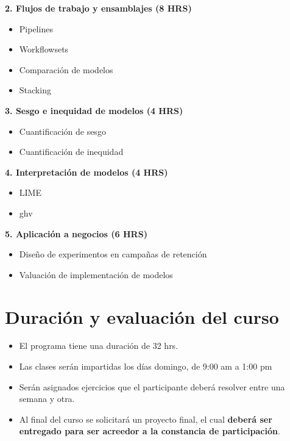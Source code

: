 \documentclass[
]{book}
\providecommand{\tightlist}{%
  \setlength{\itemsep}{0pt}\setlength{\parskip}{0pt}}
\begin{document}
\textbf{2. Flujos de trabajo y ensamblajes (8 HRS)}

\begin{itemize}
\tightlist
\item
  Pipelines
\item
  Workflowsets
\item
  Comparación de modelos
\item
  Stacking
\end{itemize}

\textbf{3. Sesgo e inequidad de modelos (4 HRS)}

\begin{itemize}
\tightlist
\item
  Cuantificación de sesgo
\item
  Cuantificación de inequidad
\end{itemize}

\textbf{4. Interpretación de modelos (4 HRS)}

\begin{itemize}
\tightlist
\item
  LIME
\item
  ghv
\end{itemize}

\textbf{5. Aplicación a negocios (6 HRS)}

\begin{itemize}
\tightlist
\item
  Diseño de experimentos en campañas de retención
\item
  Valuación de implementación de modelos
\end{itemize}

\hypertarget{duraciuxf3n-y-evaluaciuxf3n-del-curso}{%
\section{Duración y evaluación del curso}\label{duraciuxf3n-y-evaluaciuxf3n-del-curso}}

\begin{itemize}
\item
  El programa tiene una duración de 32 hrs.
\item
  Las clases serán impartidas los días domingo, de 9:00 am a 1:00 pm
\item
  Serán asignados ejercicios que el participante deberá resolver entre una semana y otra.
\item
  Al final del curso se solicitará un proyecto final, el cual \textbf{deberá ser entregado para ser acreedor a la constancia de participación}.
\end{itemize}
\end{document}
